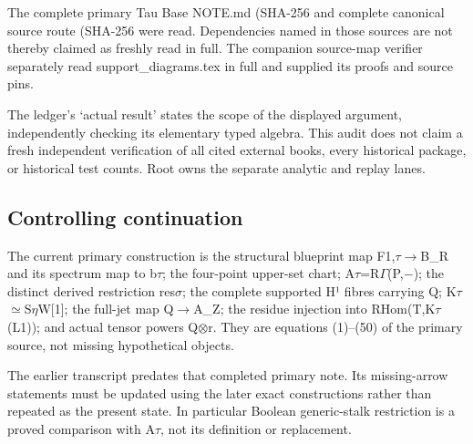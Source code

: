 \documentclass[10pt,a4paper,oneside]{report}
\begin{document}
The complete primary Tau Base NOTE.md (SHA-256
\protect{}
and complete canonical source route (SHA-256
\protect{}
were read. Dependencies named in those sources are not thereby claimed
as freshly read in full. The companion source-map verifier separately
read support\_diagrams.tex in full and supplied its proofs and source
pins.

The ledger's `actual result' states the scope of the displayed argument,
independently checking its elementary typed algebra. This audit does not
claim a fresh independent verification of all cited external books,
every historical package, or historical test counts. Root owns the
separate analytic and replay lanes.

\subsection{Controlling continuation}\label{controlling-continuation}

The current primary construction is the structural blueprint map
F1,\allowbreak{}\ensuremath{τ}\allowbreak{}\allowbreak{}\ensuremath{→}\allowbreak{}B\_R
and its spectrum map to b\allowbreak{}\ensuremath{τ}\allowbreak{}; the
four-point upper-set chart;
A\allowbreak{}\ensuremath{τ}\allowbreak{}=R\allowbreak{}\ensuremath{Γ}\allowbreak{}(P,\allowbreak{}\ensuremath{−}\allowbreak{});
the distinct derived restriction
res\allowbreak{}\ensuremath{σ}\allowbreak{}; the complete supported H¹
fibres carrying Q;
K\allowbreak{}\ensuremath{τ}\allowbreak{}\allowbreak{}\ensuremath{≃}\allowbreak{}S\allowbreak{}\ensuremath{η}\allowbreak{}W[1];
the full-jet map Q\allowbreak{}\ensuremath{→}\allowbreak{}A\_Z; the
residue injection into
RHom(T,K\allowbreak{}\ensuremath{τ}\allowbreak{}(L1)); and actual tensor
powers Q\allowbreak{}\ensuremath{⊗}\allowbreak{}r. They are equations
(1)--(50) of the primary source, not missing hypothetical objects.

The earlier transcript predates that completed primary note. Its
missing-arrow statements must be updated using the later exact
constructions rather than repeated as the present state. In particular
Boolean generic-stalk restriction is a proved comparison with
A\allowbreak{}\ensuremath{τ}\allowbreak{}, not its definition or
replacement.
\end{document}
